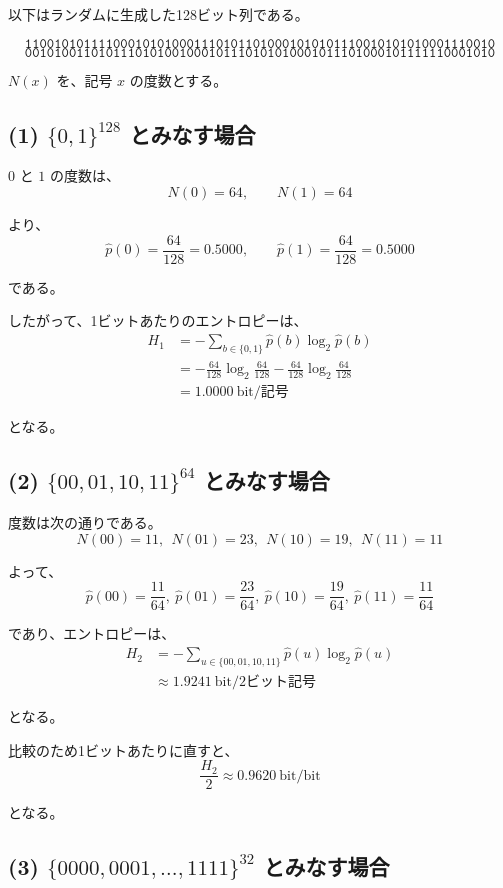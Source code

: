 \documentclass[11pt,a4paper]{jlreq}
\begin{document}
以下はランダムに生成した128ビット列である。

\[
\texttt{1100101011110001010100011101011010001010101110010101010001110010}
\]
\[
\texttt{0010100110101110101001000101110101010001011101000101111110001010}
\]

\(N(x)\) を、記号 \(x\) の度数とする。

\subsection*{(1) \boldmath$\{0,1\}^{128}$ とみなす場合}

$0$ と $1$ の度数は、
\[
N(0)=64,\qquad N(1)=64
\]

より、
\[
\hat p(0)=\frac{64}{128}=0.5000,\qquad
\hat p(1)=\frac{64}{128}=0.5000
\]

である。

したがって、1ビットあたりのエントロピーは、
\begin{align*}
H_1
&=-\sum_{b\in\{0,1\}}\hat p(b)\log_2\hat p(b)\\
&= -\frac{64}{128}\log_2\frac{64}{128}
   -\frac{64}{128}\log_2\frac{64}{128}\\
&=1.0000\ \text{bit/記号}
\end{align*}

となる。

\subsection*{(2) \boldmath$\{00,01,10,11\}^{64}$ とみなす場合}

度数は次の通りである。
\[
N(00)=11,\ \ N(01)=23,\ \ N(10)=19,\ \ N(11)=11
\]

よって、
\[
\hat p(00)=\frac{11}{64},\ \hat p(01)=\frac{23}{64},\ \hat p(10)=\frac{19}{64},\ \hat p(11)=\frac{11}{64}
\]

であり、エントロピーは、
\begin{align*}
H_2
&=-\sum_{u\in\{00,01,10,11\}}\hat p(u)\log_2\hat p(u)\\
&\approx 1.9241\ \text{bit/2ビット記号}
\end{align*}

となる。

比較のため1ビットあたりに直すと、
\[
\frac{H_2}{2}\approx 0.9620\ \text{bit/bit}
\]

となる。

\subsection*{(3) \boldmath$\{0000,0001,\dots,1111\}^{32}$ とみなす場合}
\end{document}
